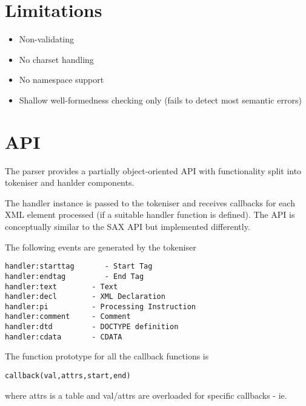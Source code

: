 \documentclass{ltxdoc}
\begin{document}
\section{Limitations}

\begin{itemize}
\item
  Non-validating
\item
  No charset handling
\item
  No namespace support
\item
  Shallow well-formedness checking only (fails to detect most semantic
  errors)
\end{itemize}
\section{API}

The parser provides a partially object-oriented API with functionality
split into tokeniser and hanlder components.

The handler instance is passed to the tokeniser and receives callbacks
for each XML element processed (if a suitable handler function is
defined). The API is conceptually similar to the SAX API but implemented
differently.

The following events are generated by the tokeniser

\begin{verbatim}
handler:starttag       - Start Tag
handler:endtag         - End Tag
handler:text        - Text
handler:decl        - XML Declaration
handler:pi          - Processing Instruction
handler:comment     - Comment
handler:dtd         - DOCTYPE definition
handler:cdata       - CDATA 
\end{verbatim}
The function prototype for all the callback functions is

\begin{verbatim}
callback(val,attrs,start,end)
\end{verbatim}
where attrs is a table and val/attrs are overloaded for specific
callbacks - ie.
\end{document}

